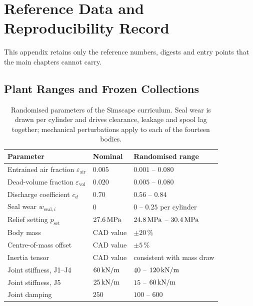 
\chapter{Reference Data and Reproducibility Record}

This appendix retains only the reference numbers, digests and entry points that
the main chapters cannot carry.

\section{Plant Ranges and Frozen Collections}
\label{app:dataset}

\begin{table}[H]
  \centering
  \caption{Randomised parameters of the Simscape curriculum. Seal wear is drawn
  per cylinder and drives clearance, leakage and spool lag together; mechanical
  perturbations apply to each of the fourteen bodies.}
  \label{tab:data:hydraulic}
  \small
  \begin{tabular}{lll}
    \toprule
    Parameter & Nominal & Randomised range \\
    \midrule
    Entrained air fraction $\varepsilon_{\mathrm{air}}$
      & $0.005$ & $0.001$ -- $0.080$ \\
    Dead-volume fraction $\varepsilon_{\mathrm{vol}}$
      & $0.020$ & $0.005$ -- $0.080$ \\
    Discharge coefficient $c_d$
      & $0.70$ & $0.56$ -- $0.84$ \\
    Seal wear $w_{\mathrm{seal},i}$
      & $0$ & $0$ -- $0.25$ per cylinder \\
    Relief setting $p_{\mathrm{set}}$
      & $\unit[27.6]{MPa}$ & $\unit[24.8]{MPa}$ -- $\unit[30.4]{MPa}$ \\
    \midrule
    Body mass & CAD value & $\pm 20\,\%$ \\
    Centre-of-mass offset & CAD value & $\pm 5\,\%$ \\
    Inertia tensor & CAD value & consistent with mass draw \\
    Joint stiffness, J1--J4 & $\unit[60]{kN/m}$ & $40$ -- $\unit[120]{kN/m}$ \\
    Joint stiffness, J5 & $\unit[25]{kN/m}$ & $15$ -- $\unit[60]{kN/m}$ \\
    Joint damping & $250$ & $100$ -- $600$ \\
    \bottomrule
  \end{tabular}
\end{table}

